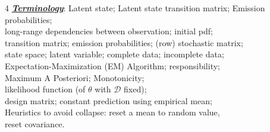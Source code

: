 \documentclass[12pt]{article}
\newcommand{\bulletPoint}[1]{\ul{\textit{\textbf{#1}}}}
\begin{document}
\begin{multicols*}{4}
\bulletPoint{Terminology}:
Latent state; Latent state transition matrix; Emission probabilities;\\
long-range dependencies between observation; initial pdf;\\
transition matrix; emission probabilities; (row) stochastic matrix;\\
state space; latent variable; complete data; incomplete data;\\
Expectation-Maximization (EM) Algorithm; responsibility;\\
Maximum A Posteriori; Monotonicity;\\
likelihood function (of $\theta$ with $\mathcal{D}$ fixed);\\
design matrix; constant prediction using empirical mean;\\
Heuristics to avoid collapse: reset a mean to random value,\\
reset covariance.


\end{multicols*}
\end{document}
